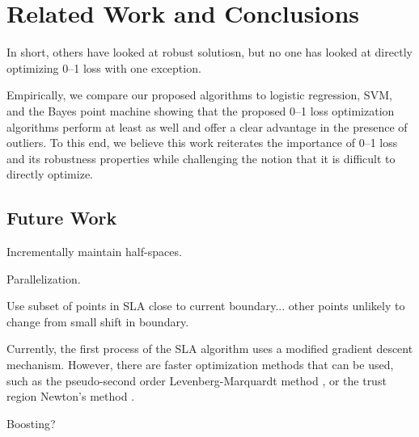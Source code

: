\section{Related Work and Conclusions}
\label{cha:conclusions}

In short, others have looked at robust solutiosn, but no one
has looked at directly optimizing 0--1 loss with one
exception.

Empirically, we compare our proposed algorithms to logistic
regression, SVM, and the Bayes point machine showing that the proposed
0--1 loss optimization algorithms perform at least as well and offer a
clear advantage in the presence of outliers.  To this end, we believe
this work reiterates the importance of 0--1 loss and its robustness
properties while challenging the notion that it is difficult to
directly optimize.


\COMMENT

\subsection{Future Work}
\label{sec:concl.futurework}

Incrementally maintain half-spaces.

Parallelization.

Use subset of points in SLA close to current boundary... other
points unlikely to change from small shift in boundary.

Currently, the first process of the SLA algorithm uses a modified
gradient descent mechanism. However, there are faster optimization
methods that can be used, such as the pseudo-second order
Levenberg-Marquardt method \cite{Marquardt}, or the trust region
Newton's method \cite{Steihaug}.

Boosting?

\ENDCOMMENT
